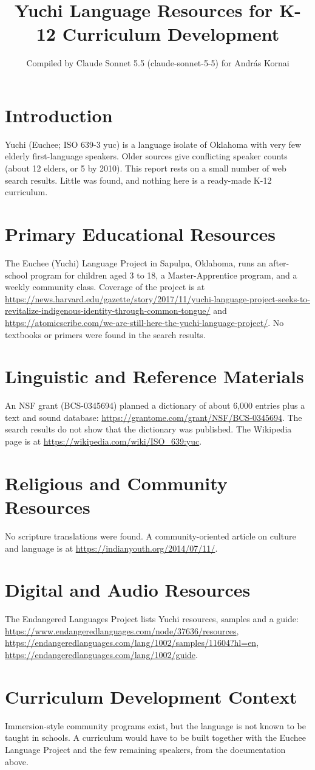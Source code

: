 \documentclass[12pt]{article}
\title{Yuchi Language Resources for K-12 Curriculum Development}
\author{Compiled by Claude Sonnet 5.5 (claude-sonnet-5-5) for Andr\'as Kornai}
\date{}
\begin{document}
\maketitle

\section{Introduction}
Yuchi (Euchee; ISO 639-3 yuc) is a language isolate of Oklahoma with very few elderly first-language speakers. Older sources give conflicting speaker counts (about 12 elders, or 5 by 2010). This report rests on a small number of web search results. Little was found, and nothing here is a ready-made K-12 curriculum.

\section{Primary Educational Resources}
The Euchee (Yuchi) Language Project in Sapulpa, Oklahoma, runs an after-school program for children aged 3 to 18, a Master-Apprentice program, and a weekly community class. Coverage of the project is at \url{https://news.harvard.edu/gazette/story/2017/11/yuchi-language-project-seeks-to-revitalize-indigenous-identity-through-common-tongue/} and \url{https://atomicscribe.com/we-are-still-here-the-yuchi-language-project/}. No textbooks or primers were found in the search results.

\section{Linguistic and Reference Materials}
An NSF grant (BCS-0345694) planned a dictionary of about 6,000 entries plus a text and sound database: \url{https://grantome.com/grant/NSF/BCS-0345694}. The search results do not show that the dictionary was published. The Wikipedia page is at \url{https://wikipedia.com/wiki/ISO_639:yuc}.

\section{Religious and Community Resources}
No scripture translations were found. A community-oriented article on culture and language is at \url{https://indianyouth.org/2014/07/11/}.

\section{Digital and Audio Resources}
The Endangered Languages Project lists Yuchi resources, samples and a guide: \url{https://www.endangeredlanguages.com/node/37636/resources}, \url{https://endangeredlanguages.com/lang/1002/samples/11604?hl=en}, \url{https://endangeredlanguages.com/lang/1002/guide}.

\section{Curriculum Development Context}
Immersion-style community programs exist, but the language is not known to be taught in schools. A curriculum would have to be built together with the Euchee Language Project and the few remaining speakers, from the documentation above.
\end{document}
